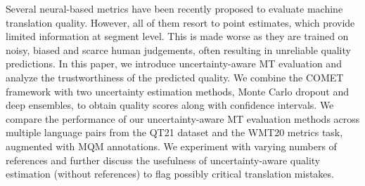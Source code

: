 Several neural-based metrics have been recently proposed to evaluate machine translation quality. However, all of them resort to point estimates, which provide limited information at segment level. This is made worse as they are trained on noisy, biased and scarce human judgements, often resulting in unreliable quality predictions. In this paper, we introduce uncertainty-aware MT evaluation and analyze the trustworthiness of the predicted quality. We combine the COMET framework with two uncertainty estimation methods, Monte Carlo dropout and deep ensembles, to obtain quality scores along with confidence intervals. We compare the performance of our uncertainty-aware MT evaluation methods across multiple language pairs from the QT21 dataset and the WMT20 metrics task, augmented with MQM annotations. We experiment with varying numbers of references and further discuss the usefulness of uncertainty-aware quality estimation (without references) to flag possibly critical translation mistakes.
